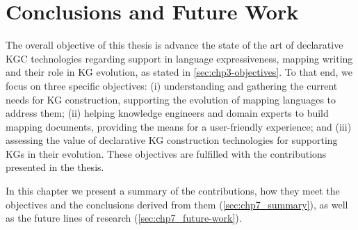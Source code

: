 \chapter{Conclusions and Future Work}
\label{chapter:conclusions}

%

The overall objective of this thesis is advance the state of the art of declarative KGC technologies regarding support in language expressiveness, mapping writing and their role in KG evolution, as stated in \cref{sec:chp3-objectives}. To that end, we focus on three specific objectives: (i) understanding and gathering the current needs for KG construction, supporting the evolution of mapping languages to address them; (ii) helping knowledge engineers and domain experts to build mapping documents, providing the means for a user-friendly experience; and (iii) assessing the value of declarative KG construction technologies for supporting KGs in their evolution. These objectives are fulfilled with the contributions presented in the thesis.

In this chapter we present a summary of the contributions, how they meet the objectives and the conclusions derived from them (\cref{sec:chp7_summary}), as well as the future lines of research (\cref{sec:chp7_future-work}). 

